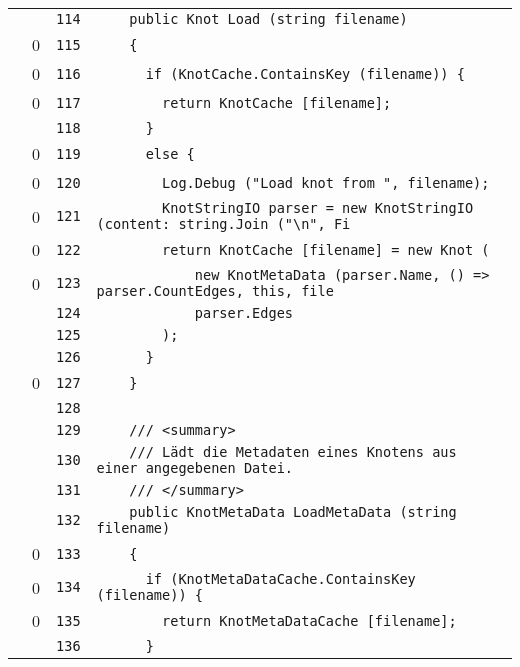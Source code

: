 \documentclass[a4paper,10pt]{article}
\begin{document}
\begin{longtable}[l]{lrrl}
\cellcolor{gray} &  & \verb~114~ & \verb~    public Knot Load (string filename)~\\
\cellcolor{red} & 0 & \verb~115~ & \verb~    {~\\
\cellcolor{red} & 0 & \verb~116~ & \verb~      if (KnotCache.ContainsKey (filename)) {~\\
\cellcolor{red} & 0 & \verb~117~ & \verb~        return KnotCache [filename];~\\
\cellcolor{gray} &  & \verb~118~ & \verb~      }~\\
\cellcolor{red} & 0 & \verb~119~ & \verb~      else {~\\
\cellcolor{red} & 0 & \verb~120~ & \verb~        Log.Debug ("Load knot from ", filename);~\\
\cellcolor{red} & 0 & \verb~121~ & \verb~        KnotStringIO parser = new KnotStringIO (content: string.Join ("\n", Fi~\\
\cellcolor{red} & 0 & \verb~122~ & \verb~        return KnotCache [filename] = new Knot (~\\
\cellcolor{red} & 0 & \verb~123~ & \verb~            new KnotMetaData (parser.Name, () => parser.CountEdges, this, file~\\
\cellcolor{gray} &  & \verb~124~ & \verb~            parser.Edges~\\
\cellcolor{gray} &  & \verb~125~ & \verb~        );~\\
\cellcolor{gray} &  & \verb~126~ & \verb~      }~\\
\cellcolor{red} & 0 & \verb~127~ & \verb~    }~\\
\cellcolor{gray} &  & \verb~128~ & \verb~~\\
\cellcolor{gray} &  & \verb~129~ & \verb~    /// <summary>~\\
\cellcolor{gray} &  & \verb~130~ & \verb~    /// Lädt die Metadaten eines Knotens aus einer angegebenen Datei.~\\
\cellcolor{gray} &  & \verb~131~ & \verb~    /// </summary>~\\
\cellcolor{gray} &  & \verb~132~ & \verb~    public KnotMetaData LoadMetaData (string filename)~\\
\cellcolor{red} & 0 & \verb~133~ & \verb~    {~\\
\cellcolor{red} & 0 & \verb~134~ & \verb~      if (KnotMetaDataCache.ContainsKey (filename)) {~\\
\cellcolor{red} & 0 & \verb~135~ & \verb~        return KnotMetaDataCache [filename];~\\
\cellcolor{gray} &  & \verb~136~ & \verb~      }~\\

\end{longtable}
\end{document}

